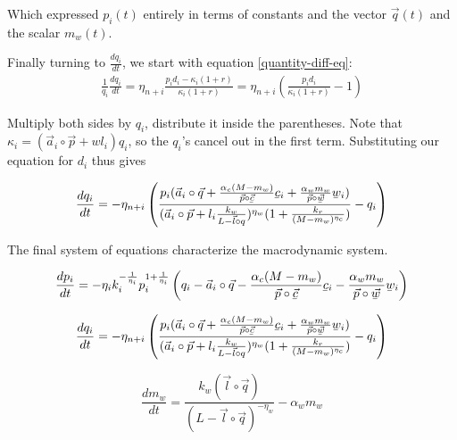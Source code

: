 \documentclass{article}
\newcommand{\ubar}[1]{\underaccent{\bar}{#1}}
\theoremstyle{definition}
\begin{document}
Which expressed $p_i(t)$ entirely in terms of constants and the vector $\vec{q}(t)$ and the scalar $m_w(t)$. 

Finally turning to $\frac{dq_i}{dt}$, we start with equation \ref{quantity-diff-eq}:
\begin{align}
    \frac{1}{q_i} \frac{dq_i}{dt} = \eta_{n+i}\frac{p_id_i-\kappa_i(1+r)}{\kappa_i(1+r)} = \eta_{n+i}\left( \frac{p_id_i}{\kappa_i(1+r)}-1 \right)
\end{align}

Multiply both sides by $q_i$, distribute it inside the parentheses. Note that $\kappa_i = (\vec{a}_i\circ\vec{p}+wl_i)q_i$, so the $q_i$'s cancel out in the first term. Substituting our equation for $d_i$ thus gives

\begin{equation}
    \frac{dq_i}{dt} = -\eta_{n+i}\left( \frac{p_i(\vec{a}_i\circ\vec{q}+\frac{\alpha_c(M-m_w)}{\vec{p}\circ\vec{\ubar{c}}}\ubar{c}_i+\frac{\alpha_wm_w}{\vec{p}\circ\vec{\ubar{w}}}\ubar{w}_i)}{(\vec{a}_i\circ \vec{p}+l_i\frac{k_w}{L-\vec{l}\circ{q}})^{\eta_w}(1+\frac{k_r}{(M-m_w)^{\eta_c}})}-q_i \right)
\end{equation}
 
The final system of equations characterize the macrodynamic system.

\begin{equation}
    \frac{dp_i}{dt} = -\eta_i k_i^{-\frac{1}{\eta_i}}p_i^{1+\frac{1}{\eta_i}}\left( q_i-\vec{a}_i\circ\vec{q}-\frac{\alpha_c(M-m_w)}{\vec{p}\circ\vec{\ubar{c}}}\ubar{c}_i-\frac{\alpha_wm_w}{\vec{p}\circ\vec{\ubar{w}}}\ubar{w}_i \right)
\end{equation}

\begin{equation}
    \frac{dq_i}{dt} = -\eta_{n+i}\left( \frac{p_i(\vec{a}_i\circ\vec{q}+\frac{\alpha_c(M-m_w)}{\vec{p}\circ\vec{\ubar{c}}}\ubar{c}_i+\frac{\alpha_wm_w}{\vec{p}\circ\vec{\ubar{w}}}\ubar{w}_i)}{(\vec{a}_i\circ \vec{p}+l_i\frac{k_w}{L-\vec{l}\circ{q}})^{\eta_w}(1+\frac{k_r}{(M-m_w)^{\eta_c}})}-q_i \right)
\end{equation}

\begin{equation}
    \frac{dm_w}{dt} = \frac{k_w(\vec{l}\circ\vec{q})}{(L-\vec{l}\circ\vec{q})^{-\eta_w}}-\alpha_w m_w
\end{equation}
\end{document}
